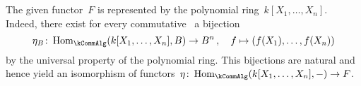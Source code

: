 \section{}





\subsection{}

The given functor~$F$ is represented by the polynomial ring~$k[X_1, \dotsc, X_n]$.
Indeed, there exist for every commutative~{\kalg} a bijection
\[
          \eta_B
  \colon  \Hom_{\kCommAlg}(k[X_1, \dotsc, X_n], B)
  \to     B^n \,,
  \quad   f
  \mapsto ( f(X_1), \dotsc, f(X_n) )
\]
by the universal property of the polynomial ring.
This bijections are natural and hence yield an isomorphism of functors~$\eta \colon \Hom_{\kCommAlg}(k[X_1, \dotsc, X_n], -) \to F$.





\addtocounter{subsection}{1}





\subsection{}

